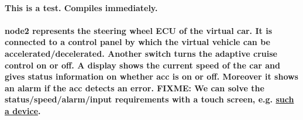 \paragraph
{
	This is a test. Compiles immediately.
}

\paragraph
{
	node2 represents the steering wheel ECU of the virtual car. It is connected to a control panel by which the virtual 
	vehicle can be accelerated/decelerated. Another switch turns the adaptive cruise control on or off.
	A display shows the current speed of the car and gives status information on whether acc is on or off.
	Moreover it shows an alarm if the acc detects an error.
	FIXME: We can solve the status/speed/alarm/input requirements with a touch screen, e.g. 
	\href{https://www.berrybase.de/3-5-ips-display-fuer-raspberry-pi-mit-resistivem-touchscreen} {such a device}.
}

